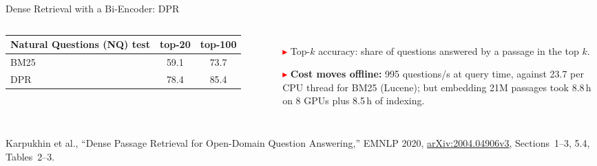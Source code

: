 \begin{frame}{Dense Retrieval with a Bi-Encoder: DPR}
\begin{columns}[T,onlytextwidth]
{{\begin{tabular}{lcc}
        \toprule
        Natural Questions (NQ) test & top-20 & top-100 \\
        \midrule
        BM25 & 59.1 & 73.7 \\
        DPR & 78.4 & 85.4 \\
        \bottomrule
      \end{tabular}\par}\par}
      \vspace{0.2em}
      \begin{itemize}\scriptsize\itemsep0.2em
        \item[\textcolor{red}{$\blacktriangleright$}] Top-$k$ accuracy: share of questions answered by a passage in the top $k$.
        \item[\textcolor{red}{$\blacktriangleright$}] \textbf{Cost moves offline:} 995 questions/s at query time, against 23.7 per CPU thread for BM25 (Lucene); but embedding 21M passages took 8.8\,h on 8 GPUs plus 8.5\,h of indexing.
      \end{itemize}
  \end{columns}
  \vspace{0.1em}
  {\scriptsize Karpukhin et al., ``Dense Passage Retrieval for Open-Domain Question Answering,'' EMNLP 2020, \href{https://arxiv.org/abs/2004.04906v3}{arXiv:2004.04906v3}, Sections~1--3, 5.4, Tables~2--3.}
\end{frame}

